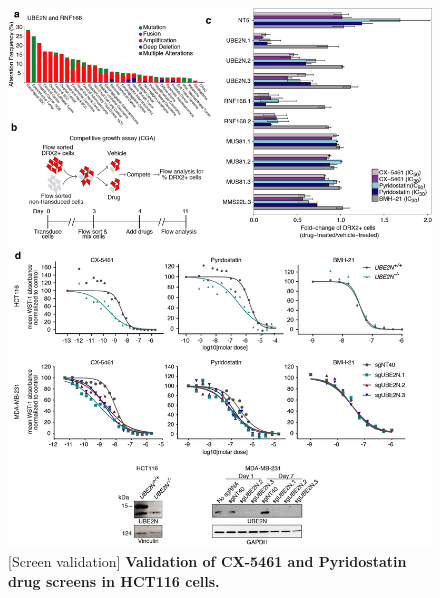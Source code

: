 \begin{figure}
    \centering
    \includegraphics[width=1\textwidth]{../figures/Figure2_genetic_validation}
    [Screen validation]
            {\small{\textbf{Validation of CX-5461 and Pyridostatin drug screens in HCT116 cells.}}
            }
        \label{fig:genetic-validation}
\end{figure}

